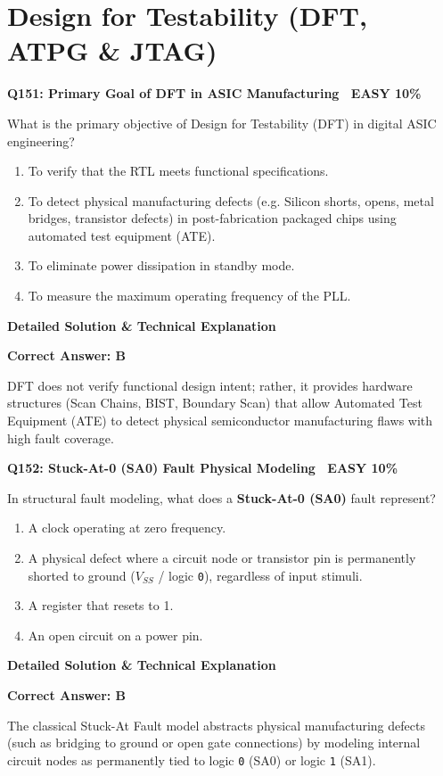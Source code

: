 \documentclass[11pt,a4paper]{article}
\newcommand{\badgeeasy}{{\color{white}\colorbox{easygreen}{\bfseries\sffamily\tiny\ EASY 10\%\ }}}
\newenvironment{qbox}[2]{%
  \begin{mdframed}[style=qstyle]%
  {\bfseries\sffamily\color{primaryblue}#1 \hfill #2}\par\vspace{2pt}%
}{%
  \end{mdframed}%
}
\newenvironment{ansbox}{%
  \begin{mdframed}[style=ansstyle]%
  {\bfseries\sffamily\color{ansgreen}\small Detailed Solution \& Technical Explanation}\par\vspace{2pt}\small%
}{%
  \end{mdframed}%
}
\begin{document}
\section{Design for Testability (DFT, ATPG \& JTAG)}

\begin{qbox}{Q151: Primary Goal of DFT in ASIC Manufacturing}{\badgeeasy}
What is the primary objective of Design for Testability (DFT) in digital ASIC engineering?
\begin{enumerate}[label=\textbf{\Alph*.}]
  \item To verify that the RTL meets functional specifications.
  \item To detect physical manufacturing defects (e.g. Silicon shorts, opens, metal bridges, transistor defects) in post-fabrication packaged chips using automated test equipment (ATE).
  \item To eliminate power dissipation in standby mode.
  \item To measure the maximum operating frequency of the PLL.
\end{enumerate}
\end{qbox}
\begin{ansbox}
\textbf{Correct Answer: B}

DFT does not verify functional design intent; rather, it provides hardware structures (Scan Chains, BIST, Boundary Scan) that allow Automated Test Equipment (ATE) to detect physical semiconductor manufacturing flaws with high fault coverage.
\end{ansbox}

\begin{qbox}{Q152: Stuck-At-0 (SA0) Fault Physical Modeling}{\badgeeasy}
In structural fault modeling, what does a \textbf{Stuck-At-0 (SA0)} fault represent?
\begin{enumerate}[label=\textbf{\Alph*.}]
  \item A clock operating at zero frequency.
  \item A physical defect where a circuit node or transistor pin is permanently shorted to ground ($V_{SS}$ / logic \texttt{0}), regardless of input stimuli.
  \item A register that resets to 1.
  \item An open circuit on a power pin.
\end{enumerate}
\end{qbox}
\begin{ansbox}
\textbf{Correct Answer: B}

The classical Stuck-At Fault model abstracts physical manufacturing defects (such as bridging to ground or open gate connections) by modeling internal circuit nodes as permanently tied to logic \texttt{0} (SA0) or logic \texttt{1} (SA1).
\end{ansbox}
\end{document}
